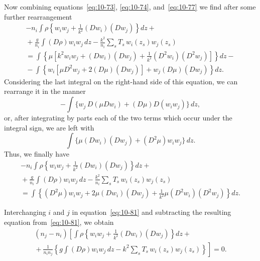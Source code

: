 Now combining equations~\eqref{eq:10-73}, \eqref{eq:10-74}, and~\eqref{eq:10-77} we find after some further rearrangement
\begin{align}
\label{eq:10-78}
-n_i\int\rho\!\left\{w_iw_j+\frac{1}{k^2}(Dw_i)(Dw_j)\right\}\!dz + {} \nonumber\\
{} + \frac{g}{n_i}\int(D\rho)w_iw_j\,dz - \frac{k^2}{n_i}\sum_s T_s\,w_i(z_s)w_j(z_s) \nonumber\\
= \int\left\{\mu\!\left[k^2w_iw_j+(Dw_i)(Dw_j)+\frac{1}{k^2}(D^2w_i)(D^2w_j)\right]\right\}\!dz - \nonumber\\
{} - \int\left\{w_i[\mu D^2w_j + 2(D\mu)(Dw_j)] + w_j(D\mu)(Dw_j)\right\}\!dz.
\end{align}
Considering the last integral on the right-hand side of this equation, we can rearrange it in the manner
\begin{equation}
\label{eq:10-79}
-\int\{w_j\,D(\mu Dw_i)+(D\mu)D(w_iw_j)\}\,dz,
\end{equation}
or, after integrating by parts each of the two terms which occur under the integral sign, we are left with
\begin{equation}
\label{eq:10-80}
\int\{\mu(Dw_i)(Dw_j)+(D^2\mu)w_iw_j\}\,dz.
\end{equation}
Thus, we finally have
\begin{align}
\label{eq:10-81}
-n_i\int\rho\!\left\{w_iw_j+\frac{1}{k^2}(Dw_i)(Dw_j)\right\}\!dz + {} \nonumber\\
{} + \frac{g}{n_i}\int(D\rho)w_iw_j\,dz - \frac{k^2}{n_i}\sum_s T_s\,w_i(z_s)w_j(z_s) \nonumber\\
= \int\left\{(D^2\mu)w_iw_j + 2\mu(Dw_i)(Dw_j) + \frac{1}{k^2}\mu(D^2w_i)(D^2w_j)\right\}\!dz.
\end{align}

Interchanging $i$ and $j$ in equation~\eqref{eq:10-81} and subtracting the resulting equation from~\eqref{eq:10-81}, we obtain
\begin{align}
\label{eq:10-82}
(n_j-n_i)\!\left[\int\rho\!\left\{w_iw_j+\frac{1}{k^2}(Dw_i)(Dw_j)\right\}\!dz + {} \right. \nonumber\\
\left. {} + \frac{1}{n_in_j}\!\left\{g\int(D\rho)w_iw_j\,dz - k^2\sum_s T_s\,w_i(z_s)w_j(z_s)\right\}\right] = 0.
\end{align}

